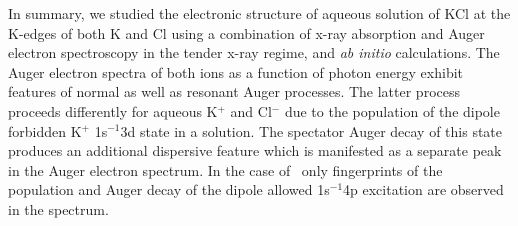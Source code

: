 
In summary, we studied the electronic structure of aqueous solution of KCl at the K-edges of both K and Cl using a combination of x-ray absorption and Auger electron spectroscopy in the tender x-ray regime, and {\it ab initio} calculations. The Auger electron spectra of both ions as a function of photon energy exhibit features of normal as well as resonant Auger processes. The latter process proceeds differently for aqueous K$^{+}$ and Cl$^{-}$ due to the population of the dipole forbidden K$^{+}$ 1s$^{-1}$3d state in a solution. The spectator Auger decay of this state produces an additional dispersive feature which is manifested as a separate peak in the Auger electron spectrum. In the case of \cli~only fingerprints of the population and Auger decay of the dipole allowed 1s$^{-1}$4p excitation are observed in the spectrum.



